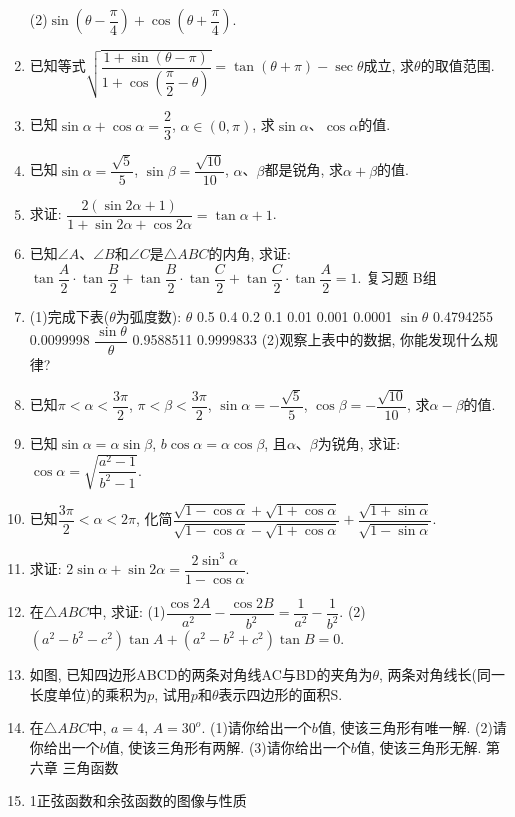 \documentclass[10pt,a4paper]{article}
\begin{document}
\begin{enumerate}[1.]
(2)$\sin (\theta -\dfrac{\pi }4)+\cos (\theta +\dfrac{\pi }4)$.
\item 已知等式$\sqrt {\dfrac{1+\sin (\theta -\pi)}{1+\cos (\dfrac{\pi }2-\theta)}}=\tan (\theta +\pi)-\sec \theta$成立, 求$\theta$的取值范围.
\item 已知$\sin \alpha +\cos \alpha =\dfrac 23$, $\alpha \in (0,\pi)$, 求$\sin \alpha$、$\cos \alpha$的值.
\item 已知$\sin \alpha =\dfrac{\sqrt 5}5$, $\sin \beta =\dfrac{\sqrt {10}}{10}$, $\alpha$、$\beta$都是锐角, 求$\alpha +\beta$的值.
\item 求证: $\dfrac{2(\sin 2\alpha +1)}{1+\sin 2\alpha +\cos 2\alpha }=\tan \alpha +1$.
\item 已知$\angle A$、$\angle B$和$\angle C$是$\triangle ABC$的内角,
求证: $\tan \dfrac A2\cdot \tan \dfrac B2+\tan \dfrac B2\cdot \tan \dfrac C2+\tan \dfrac C2\cdot \tan \dfrac A2=1$.
复习题
B组
\item (1)完成下表($\theta$为弧度数):
$\theta$	0.5	0.4	0.2	0.1	0.01	0.001	0.0001
$\sin \theta$	0.4794255				0.0099998		
$\dfrac{\sin \theta }{\theta }$	0.9588511				0.9999833		
(2)观察上表中的数据, 你能发现什么规律?
\item 已知$\pi <\alpha <\dfrac{3\pi }2$, $\pi <\beta <\dfrac{3\pi }2$, $\sin \alpha =-\dfrac{\sqrt 5}5$, $\cos \beta =-\dfrac{\sqrt {10}}{10}$, 求$\alpha -\beta$的值.
\item 已知$\sin \alpha =\alpha \sin \beta$, $b\cos \alpha =\alpha \cos \beta$, 且$\alpha$、$\beta$为锐角, 求证: $\cos \alpha =\sqrt {\dfrac{{a^2}-1}{{b^2}-1}}$.
\item 已知$\dfrac{3\pi }2<\alpha <2\pi$, 化简$\dfrac{\sqrt {1-\cos \alpha }+\sqrt {1+\cos \alpha }}{\sqrt {1-\cos \alpha }-\sqrt {1+\cos \alpha }}+\dfrac{\sqrt {1+\sin \alpha }}{\sqrt {1-\sin \alpha }}$.
\item 求证: $2\sin \alpha +\sin 2\alpha =\dfrac{2{{\sin }^3}\alpha }{1-\cos \alpha }$.
\item 在$\triangle ABC$中, 求证:
(1)$\dfrac{\cos 2A}{a^2}-\dfrac{\cos 2B}{b^2}=\dfrac 1{a^2}-\dfrac 1{b^2}$.
(2)$(a^2-b^2-c^2)\tan A+(a^2-b^2+c^2)\tan B=0$.
\item 如图, 已知四边形ABCD的两条对角线AC与BD的夹角为$\theta$, 两条对角线长(同一长度单位)的乘积为$p$, 试用$p$和$\theta$表示四边形的面积S.
\item 在$\triangle ABC$中, $a=4$, $A=30^o$.
(1)请你给出一个$b$值, 使该三角形有唯一解.
(2)请你给出一个$b$值, 使该三角形有两解.
(3)请你给出一个$b$值, 使该三角形无解.
第六章  三角函数
\item 1正弦函数和余弦函数的图像与性质

\end{enumerate}
\end{document}
